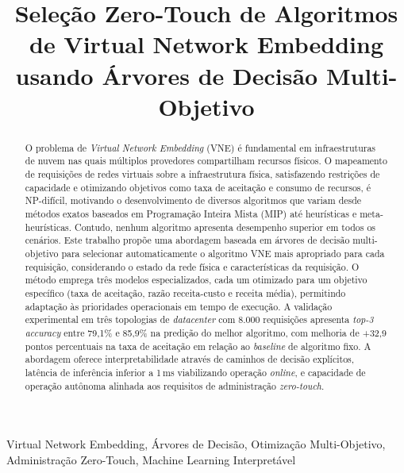 \documentclass[conference]{IEEEtran}
\begin{document}
\title{Seleção Zero-Touch de Algoritmos de Virtual Network Embedding usando Árvores de Decisão Multi-Objetivo}

\author{
}

\maketitle

\begin{abstract}
O problema de \textit{Virtual Network Embedding} (VNE) é fundamental em infraestruturas de nuvem nas quais múltiplos provedores compartilham recursos físicos. O mapeamento de requisições de redes virtuais sobre a infraestrutura física, satisfazendo restrições de capacidade e otimizando objetivos como taxa de aceitação e consumo de recursos, é NP-difícil, motivando o desenvolvimento de diversos algoritmos que variam desde métodos exatos baseados em Programação Inteira Mista (MIP) até heurísticas e meta-heurísticas. Contudo, nenhum algoritmo apresenta desempenho superior em todos os cenários. Este trabalho propõe uma abordagem baseada em árvores de decisão multi-objetivo para selecionar automaticamente o algoritmo VNE mais apropriado para cada requisição, considerando o estado da rede física e características da requisição. O método emprega três modelos especializados, cada um otimizado para um objetivo específico (taxa de aceitação, razão receita-custo e receita média), permitindo adaptação às prioridades operacionais em tempo de execução. A validação experimental em três topologias de \textit{datacenter} com 8.000 requisições apresenta \textit{top-3 accuracy} entre 79,1\% e 85,9\% na predição do melhor algoritmo, com melhoria de +32,9 pontos percentuais na taxa de aceitação em relação ao \textit{baseline} de algoritmo fixo. A abordagem oferece interpretabilidade através de caminhos de decisão explícitos, latência de inferência inferior a 1\,ms viabilizando operação \textit{online}, e capacidade de operação autônoma alinhada aos requisitos de administração \textit{zero-touch}.
\end{abstract}

\begin{IEEEkeywords}
Virtual Network Embedding, Árvores de Decisão, Otimização Multi-Objetivo, Administração Zero-Touch, Machine Learning Interpretável
\end{IEEEkeywords}
\end{document}
